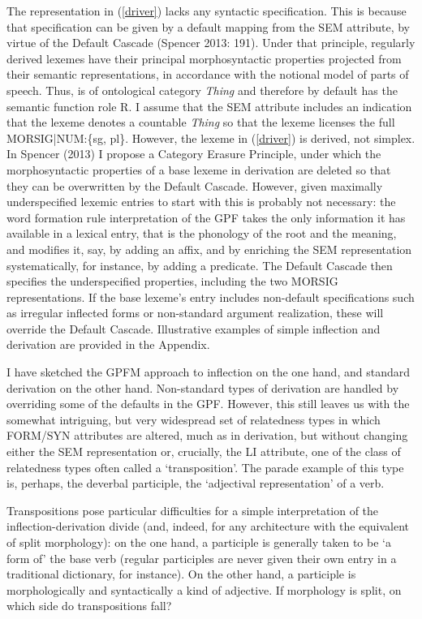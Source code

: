 \documentclass[output=paper,
modfonts
]{LSP/langsci}
\begin{document}
The representation in (\ref{driver}) lacks any syntactic specification. This is because that specification can be given by a default mapping from the SEM attribute, by virtue of the Default Cascade (Spencer 2013: 191). Under that principle,  regularly derived lexemes have their principal morphosyntactic properties projected from their semantic representations, in accordance with the notional model of parts of speech. Thus,  is of ontological category \emph{Thing} and therefore by default has the semantic function role R. I assume that the SEM attribute includes an indication that the lexeme denotes a countable \emph{Thing} so that the lexeme licenses the full MORSIG|NUM:\{sg, pl\}. However, the lexeme in (\ref{driver}) is derived, not simplex. In Spencer (2013) I propose a Category Erasure Principle, under which the morphosyntactic properties of a base lexeme in derivation are deleted so that they can be overwritten by the Default Cascade. However, given maximally underspecified lexemic entries to start with this is probably not necessary: the word formation rule interpretation of the GPF takes the only information it has available in a lexical entry, that is the phonology of the root and the meaning, and modifies it, say, by adding an affix, and by enriching the SEM representation systematically, for instance, by adding a predicate. The Default Cascade then specifies the underspecified properties, including the two MORSIG representations. If the base lexeme’s entry includes non-default specifications such as irregular inflected forms or non-standard argument realization, these will override the Default Cascade. Illustrative examples of simple inflection and derivation are provided in the Appendix.

I have sketched the GPFM approach to inflection on the one hand, and standard derivation on the other hand. Non-standard types of derivation are handled by overriding some of the defaults in the GPF. However, this still  leaves us with the somewhat intriguing, but very widespread set of relatedness types in which FORM/SYN attributes are altered, much as in derivation, but without changing either the SEM representation or, crucially, the LI attribute, one of the class of relatedness types often called a ‘transposition’. The parade example of this type is, perhaps, the deverbal participle, the ‘adjectival representation’ of a verb.
 
Transpositions pose particular difficulties for a simple interpretation of the inflection-derivation divide (and, indeed, for any architecture with the equivalent of split morphology): on the one hand, a participle is generally taken to be ‘a form of’ the base verb (regular participles are never given their own entry in a traditional dictionary, for instance). On the other hand, a participle is morphologically and syntactically a kind of adjective. If morphology is split, on which side do transpositions fall?
\end{document}

